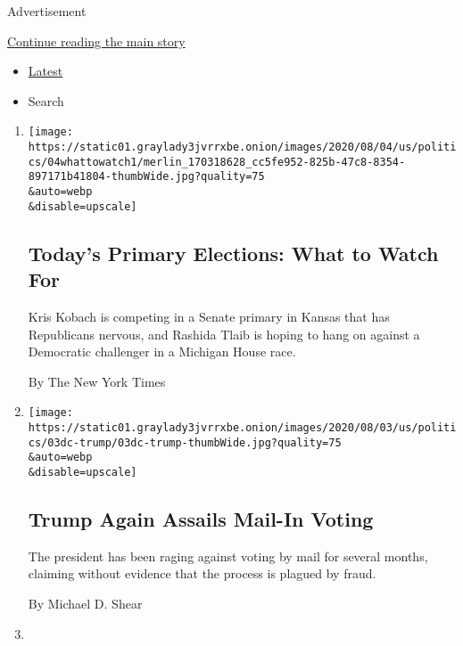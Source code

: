 Advertisement

\protect\hyperlink{after-mid1}{Continue reading the main story}

\begin{itemize}
\tightlist
\item
  \protect\hyperlink{stream-panel}{Latest}
\item
  Search
\end{itemize}

\begin{enumerate}
\def\labelenumi{\arabic{enumi}.}
\item
  \href{/2020/08/04/us/elections/primary-election-michigan-arizona-kansas.html}{}

  \texttt{[image: https://static01.graylady3jvrrxbe.onion/images/2020/08/04/us/politics/04whattowatch1/merlin\_170318628\_cc5fe952-825b-47c8-8354-897171b41804-thumbWide.jpg?quality=75\\\&auto=webp\\\&disable=upscale]}

  \hypertarget{todays-primary-elections-what-to-watch-for}{%
  \subsection{Today's Primary Elections: What to Watch
  For}\label{todays-primary-elections-what-to-watch-for}}

  Kris Kobach is competing in a Senate primary in Kansas that has
  Republicans nervous, and Rashida Tlaib is hoping to hang on against a
  Democratic challenger in a Michigan House race.

  By The New York Times
\item
  \href{/2020/08/03/us/politics/trump-mail-in-voting.html}{}

  \texttt{[image: https://static01.graylady3jvrrxbe.onion/images/2020/08/03/us/politics/03dc-trump/03dc-trump-thumbWide.jpg?quality=75\\\&auto=webp\\\&disable=upscale]}

  \hypertarget{trump-again-assails-mail-in-voting}{%
  \subsection{Trump Again Assails Mail-In
  Voting}\label{trump-again-assails-mail-in-voting}}

  The president has been raging against voting by mail for several
  months, claiming without evidence that the process is plagued by
  fraud.

  By Michael D. Shear
\item
  \href{/2020/08/03/us/politics/tata-pentagon.html}{}


\end{enumerate}
